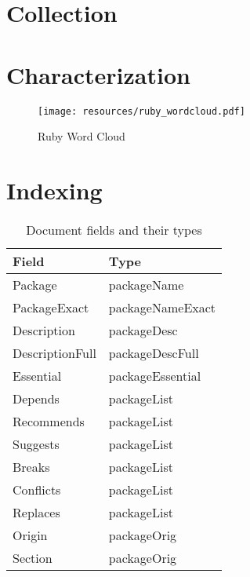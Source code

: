 \appendix

\section{Collection}



\newpage

\section{Characterization}


\begin{figure}[!hb]
    \centering
    \texttt{[image: resources/ruby\_wordcloud.pdf]}
    \caption{Ruby Word Cloud}
    \label{fig:word-cloud}
\end{figure}

\newpage
\section{Indexing}



\begingroup
    \renewcommand{\arraystretch}{2} %
    \begin{table}[ht]
        \centering
        \begin{tabular}{ll}
            Field           & Type             \\
            \hline
            Package         & packageName      \\
            PackageExact    & packageNameExact \\
            Description     & packageDesc      \\
            DescriptionFull & packageDescFull  \\
            Essential       & packageEssential \\
            Depends         & packageList      \\
            Recommends      & packageList      \\
            Suggests        & packageList      \\
            Breaks          & packageList      \\
            Conflicts       & packageList      \\
            Replaces        & packageList      \\
            Origin          & packageOrig      \\
            Section         & packageOrig     
        \end{tabular}
        \caption{Document fields and their types}
        \label{tab:indexed-fields}
    \end{table}
\endgroup

